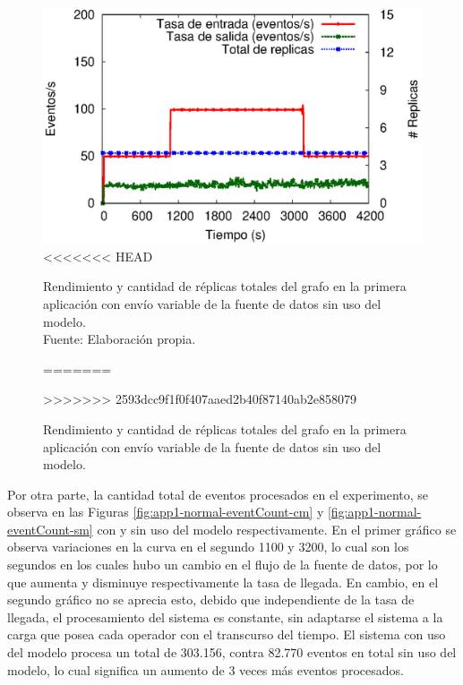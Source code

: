 \begin{figure}[!ht]
	\centering
	\captionsetup{justification=centering}
	\includegraphics[scale=0.7]{images/exp/app1/normal/sm/processSystem.eps}
<<<<<<< HEAD
    \caption[Rendimiento y cantidad de réplicas totales del grafo en la primera aplicación con envío variable de la fuente de datos sin uso del modelo.]{Rendimiento y cantidad de réplicas totales del grafo en la primera aplicación con envío variable de la fuente de datos sin uso del modelo.\\Fuente: Elaboración propia.}
=======
    \caption{Rendimiento y cantidad de r\'eplicas totales del grafo en la primera aplicaci\'on con env\'io variable de la fuente de datos sin uso del modelo.}
>>>>>>> 2593dcc9f1f0f407aaed2b40f87140ab2e858079
	\label{fig:app1-normal-processSystem-sm}
\end{figure}

Por otra parte, la cantidad total de eventos procesados en el experimento, se observa en las Figuras \ref{fig:app1-normal-eventCount-cm} y \ref{fig:app1-normal-eventCount-sm} con y sin uso del modelo respectivamente. En el primer gr\'afico se observa variaciones en la curva en el segundo 1100 y 3200, lo cual son los segundos en los cuales hubo un cambio en el flujo de la fuente de datos, por lo que aumenta y disminuye respectivamente la tasa de llegada. En cambio, en el segundo gr\'afico no se aprecia esto, debido que independiente de la tasa de llegada, el procesamiento del sistema es constante, sin adaptarse el sistema a la carga que posea cada operador con el transcurso del tiempo. El sistema con uso del modelo procesa un total de 303.156, contra 82.770 eventos en total sin uso del modelo, lo cual significa un aumento de 3 veces m\'as eventos procesados.

